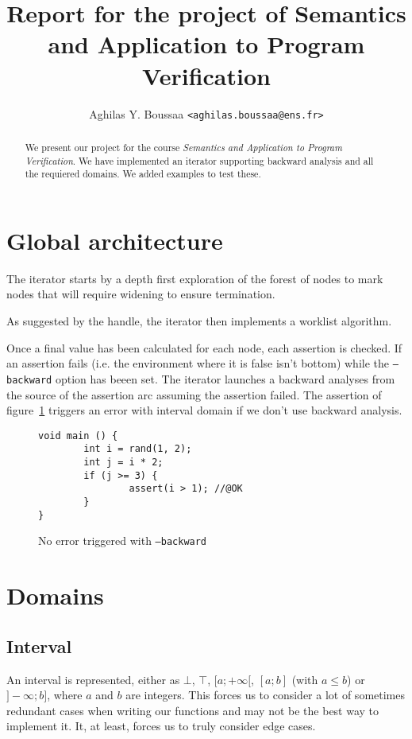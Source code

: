 \documentclass[11pt]{article}
\author{Aghilas Y. Boussaa \texttt{<aghilas.boussaa@ens.fr>}}
\title{Report for the project of Semantics and Application to Program Verification}
\begin{document}
\maketitle
\begin{abstract}
  We present our project for the course \textit{Semantics and Application to
    Program Verification}. We have implemented an iterator supporting backward
  analysis and all the requiered domains. We added examples to test these.
\end{abstract}
\section{Global architecture}
The iterator starts by a depth first exploration of the forest of nodes to mark
nodes that will require widening to ensure termination.

As suggested by the handle, the iterator then implements a worklist algorithm.

Once a final value has been calculated for each node, each assertion is checked.
If an assertion fails (i.e. the environment where it is false isn't bottom)
while the \texttt{---backward} option has beeen set. The iterator launches a
backward analyses from the source of the assertion arc assuming the assertion
failed. The assertion of figure~\ref{backward} triggers an error with interval
domain if we don't use backward analysis.
\begin{figure}[h]
\begin{verbatim}
void main () {
        int i = rand(1, 2);
        int j = i * 2;
        if (j >= 3) {
                assert(i > 1); //@OK
        }
}
\end{verbatim}
\caption{No error triggered with \texttt{---backward}}\label{backward}
\end{figure}
\section{Domains}
\subsection{Interval}
An interval is represented, either as $\bot$, $\top$, $[a;+\infty[$, $[a;b]$
    (with $a\leq b$) or $]-\infty;b]$, where $a$ and $b$ are integers. This
forces us to consider a lot of sometimes redundant cases when writing our
functions and may not be the best way to implement it. It, at least, forces us
to truly consider edge cases.
\end{document}
